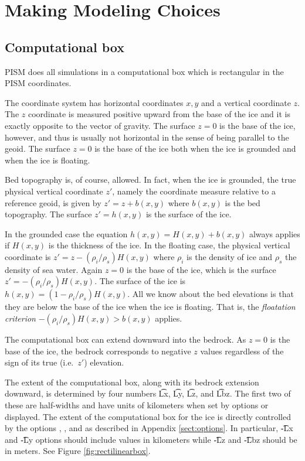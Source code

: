 
\section{Making Modeling Choices}
\label{sec:modeling-choices}

\subsection{Computational box} \label{subsect:coords} PISM does all simulations in a computational box which is rectangular in the PISM coordinates.

The coordinate system has horizontal coordinates $x,y$ and a vertical coordinate $z$.  The $z$ coordinate is measured positive upward from the base of the ice and it is exactly opposite to the vector of gravity.  The surface $z=0$ is the base of the ice, however, and thus is usually not horizontal in the sense of being parallel to the geoid.   The surface $z=0$ is the base of the ice both when the ice is grounded and when the ice is floating.

Bed topography is, of course, allowed.  In fact, when the ice is grounded, the true physical vertical coordinate $z'$, namely the coordinate measure relative to a reference geoid, is given by $z'=z+b(x,y)$ where $b(x,y)$ is the bed topography.  The surface $z'=h(x,y)$ is the surface of the ice.

In the grounded case the equation $h(x,y)=H(x,y)+b(x,y)$ always applies if $H(x,y)$ is the thickness of the ice.  In the floating case, the physical vertical coordinate is $z'=z-(\rho_i/\rho_s) H(x,y)$ where $\rho_i$ is the density of ice and $\rho_s$ the density of sea water.  Again $z=0$ is the base of the ice, which is the surface $z' = -(\rho_i/\rho_s) H(x,y)$.  The surface of the ice is $h(x,y) = (1-\rho_i/\rho_s) H(x,y)$.  All we know about the bed elevations is that they are below the base of the ice when the ice is floating.  That is, the \emph{floatation criterion} $-(\rho_i/\rho_s) H(x,y) > b(x,y)$ applies.

The computational box can extend downward into the bedrock.  As $z=0$ is the base of the ice, the bedrock corresponds to negative $z$ values regardless of the sign of its true (i.e.~$z'$) elevation.

The extent of the computational box, along with its bedrock extension downward, is determined by four numbers \t{Lx}, \t{Ly}, \t{Lz}, and \t{Lbz}.  The first two of these are half-widths and have units of kilometers when set by options or displayed.  The extent of the computational box for the ice is directly controlled by the options , , and  as described in Appendix \ref{sect:options}.  In particular, \t{-Lx} and \t{-Ly} options should include values in kilometers while \t{-Lz} and \t{-Lbz} should be in meters. See Figure \ref{fig:rectilinearbox}.


